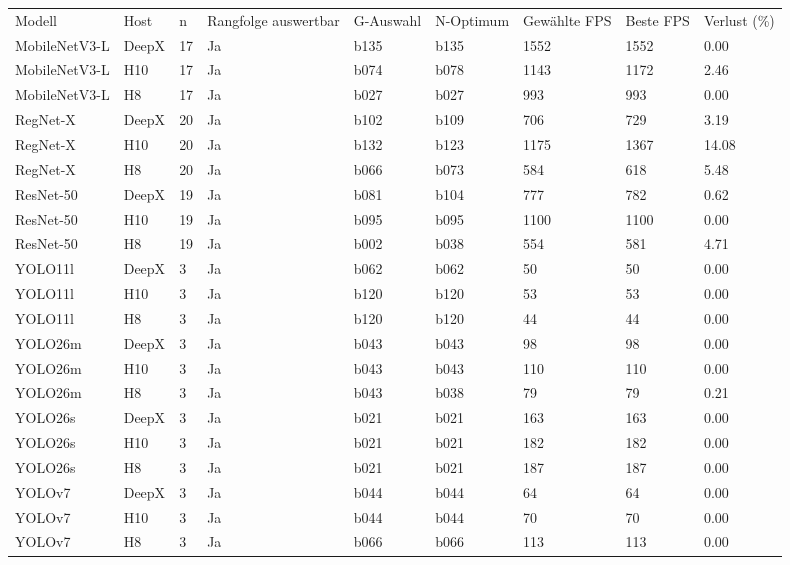 \begin{tabular}{lllllllll}
Modell & Host & n & Rangfolge auswertbar & G-Auswahl & N-Optimum & Gewählte FPS & Beste FPS & Verlust (\%) \\
MobileNetV3-L & DeepX & 17 & Ja & b135 & b135 & 1552 & 1552 & 0.00 \\
MobileNetV3-L & H10 & 17 & Ja & b074 & b078 & 1143 & 1172 & 2.46 \\
MobileNetV3-L & H8 & 17 & Ja & b027 & b027 & 993 & 993 & 0.00 \\
RegNet-X & DeepX & 20 & Ja & b102 & b109 & 706 & 729 & 3.19 \\
RegNet-X & H10 & 20 & Ja & b132 & b123 & 1175 & 1367 & 14.08 \\
RegNet-X & H8 & 20 & Ja & b066 & b073 & 584 & 618 & 5.48 \\
ResNet-50 & DeepX & 19 & Ja & b081 & b104 & 777 & 782 & 0.62 \\
ResNet-50 & H10 & 19 & Ja & b095 & b095 & 1100 & 1100 & 0.00 \\
ResNet-50 & H8 & 19 & Ja & b002 & b038 & 554 & 581 & 4.71 \\
YOLO11l & DeepX & 3 & Ja & b062 & b062 & 50 & 50 & 0.00 \\
YOLO11l & H10 & 3 & Ja & b120 & b120 & 53 & 53 & 0.00 \\
YOLO11l & H8 & 3 & Ja & b120 & b120 & 44 & 44 & 0.00 \\
YOLO26m & DeepX & 3 & Ja & b043 & b043 & 98 & 98 & 0.00 \\
YOLO26m & H10 & 3 & Ja & b043 & b043 & 110 & 110 & 0.00 \\
YOLO26m & H8 & 3 & Ja & b043 & b038 & 79 & 79 & 0.21 \\
YOLO26s & DeepX & 3 & Ja & b021 & b021 & 163 & 163 & 0.00 \\
YOLO26s & H10 & 3 & Ja & b021 & b021 & 182 & 182 & 0.00 \\
YOLO26s & H8 & 3 & Ja & b021 & b021 & 187 & 187 & 0.00 \\
YOLOv7 & DeepX & 3 & Ja & b044 & b044 & 64 & 64 & 0.00 \\
YOLOv7 & H10 & 3 & Ja & b044 & b044 & 70 & 70 & 0.00 \\
YOLOv7 & H8 & 3 & Ja & b066 & b066 & 113 & 113 & 0.00 \\
\end{tabular}
